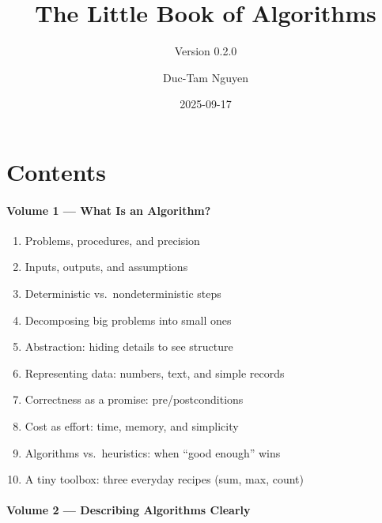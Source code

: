 \documentclass[
  letterpaper,
  DIV=11,
  numbers=noendperiod]{scrreprt}
\title{The Little Book of Algorithms}
\subtitle{Version 0.2.0}
\author{Duc-Tam Nguyen}
\date{2025-09-17}
\providecommand{\tightlist}{%
  \setlength{\itemsep}{0pt}\setlength{\parskip}{0pt}}
\renewcommand*\contentsname{Table of contents}
\newcommand\contentsname{Table of contents}
\begin{document}
\maketitle

\renewcommand*\contentsname{Table of contents}
{
\hypersetup{linkcolor=}
\setcounter{tocdepth}{2}
\tableofcontents
}


\chapter{Contents}\label{contents}

\subsubsection{Volume 1 --- What Is an
Algorithm?}\label{volume-1-what-is-an-algorithm}

\begin{enumerate}
\def\labelenumi{\arabic{enumi}.}
\tightlist
\item
  Problems, procedures, and precision
\item
  Inputs, outputs, and assumptions
\item
  Deterministic vs.~nondeterministic steps
\item
  Decomposing big problems into small ones
\item
  Abstraction: hiding details to see structure
\item
  Representing data: numbers, text, and simple records
\item
  Correctness as a promise: pre/postconditions
\item
  Cost as effort: time, memory, and simplicity
\item
  Algorithms vs.~heuristics: when ``good enough'' wins
\item
  A tiny toolbox: three everyday recipes (sum, max, count)
\end{enumerate}

\subsubsection{Volume 2 --- Describing Algorithms
Clearly}\label{volume-2-describing-algorithms-clearly}
\end{document}
